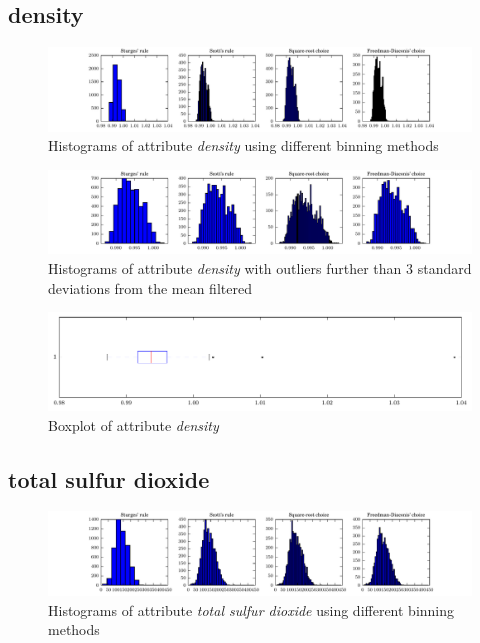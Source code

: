 \documentclass{report}
\begin{document}
\newpage\subsection{density}
\begin{figure}[H]
\includegraphics[width=\textwidth]{histograms/density.pdf}
\caption{Histograms of attribute \emph{density} using different binning methods}\end{figure}

\begin{figure}[H]
\includegraphics[width=\textwidth]{histograms/density_filtered.pdf}
\caption{Histograms of attribute \emph{density} with outliers further than 3 standard deviations from the mean filtered}\n\end{figure}

\begin{figure}[H]
\includegraphics[width=\textwidth]{boxplots/density.pdf}
\caption{Boxplot of attribute \emph{density}}\end{figure}

\newpage\subsection{total sulfur dioxide}
\begin{figure}[H]
\includegraphics[width=\textwidth]{histograms/total_sulfur_dioxide.pdf}
\caption{Histograms of attribute \emph{total sulfur dioxide} using different binning methods}\end{figure}
\end{document}

